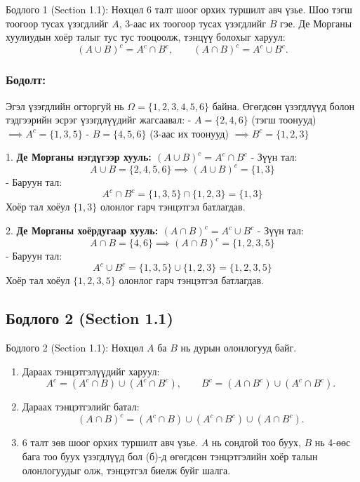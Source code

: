\documentclass[11pt,a4paper]{article}
\begin{document}
\begin{problembox}{Бодлого 1 (Section 1.1): Нөхцөл}
6 талт шоог орхих туршилт авч үзье. Шоо тэгш тоогоор тусах үзэгдлийг $A$, 3-аас их тоогоор тусах үзэгдлийг $B$ гэе. Де Морганы хуулиудын хоёр талыг тус тус тооцоолж, тэнцүү болохыг харуул:
\[
  (A \cup B)^c = A^c \cap B^c, \qquad (A \cap B)^c = A^c \cup B^c.
\]
\end{problembox}

\subsubsection*{Бодолт:}

Эгэл үзэгдлийн огторгуй нь $\Omega = \{1, 2, 3, 4, 5, 6\}$ байна.
Өгөгдсөн үзэгдлүүд болон тэдгээрийн эсрэг үзэгдлүүдийг жагсаавал:
- $A = \{2, 4, 6\}$ (тэгш тоонууд) $\implies A^c = \{1, 3, 5\}$
- $B = \{4, 5, 6\}$ (3-аас их тоонууд) $\implies B^c = \{1, 2, 3\}$

1. 				\textbf{Де Морганы нэгдүгээр хууль: $(A \cup B)^c = A^c \cap B^c$}
   - Зүүн тал:
     \[
       A \cup B = \{2, 4, 5, 6\} \implies (A \cup B)^c = \{1, 3\}
     \]
   - Баруун тал:
     \[
       A^c \cap B^c = \{1, 3, 5\} \cap \{1, 2, 3\} = \{1, 3\}
     \]
   Хоёр тал хоёул $\{1, 3\}$ олонлог гарч тэнцэтгэл батлагдав.

2. 				\textbf{Де Морганы хоёрдугаар хууль: $(A \cap B)^c = A^c \cup B^c$}
   - Зүүн тал:
     \[
       A \cap B = \{4, 6\} \implies (A \cap B)^c = \{1, 2, 3, 5\}
     \]
   - Баруун тал:
     \[
       A^c \cup B^c = \{1, 3, 5\} \cup \{1, 2, 3\} = \{1, 2, 3, 5\}
     \]
   Хоёр тал хоёул $\{1, 2, 3, 5\}$ олонлог гарч тэнцэтгэл батлагдав.

\vspace{0.8em}

\subsection*{Бодлого 2 (Section 1.1)}

\begin{problembox}{Бодлого 2 (Section 1.1): Нөхцөл}
$A$ ба $B$ нь дурын олонлогууд байг.
\begin{enumerate}[label=\textbf{(\alph*)}, leftmargin=1.8em, itemsep=1pt]
  \item Дараах тэнцэтгэлүүдийг харуул:
  \[
    A^c = (A^c \cap B) \cup (A^c \cap B^c), \qquad B^c = (A \cap B^c) \cup (A^c \cap B^c).
  \]
  \item Дараах тэнцэтгэлийг батал:
  \[
    (A \cap B)^c = (A^c \cap B) \cup (A^c \cap B^c) \cup (A \cap B^c).
  \]
  \item 6 талт зөв шоог орхих туршилт авч үзье. $A$ нь сондгой тоо буух, $B$ нь 4-өөс бага тоо буух үзэгдлүүд бол (б)-д өгөгдсөн тэнцэтгэлийн хоёр талын олонлогуудыг олж, тэнцэтгэл биелж буйг шалга.
\end{enumerate}
\end{problembox}
\end{document}
